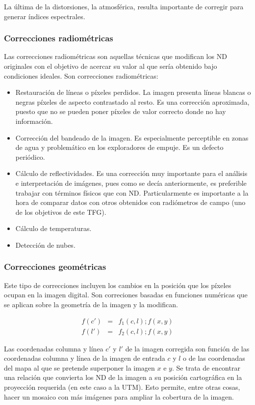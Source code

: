 La última de la distorsiones, la atmosférica, resulta importante de corregir para generar índices espectrales.\Sep

\subsubsection{Correcciones radiométricas}
Las correcciones radiométricas son aquellas técnicas que modifican los \ac{ND} originales con el objetivo de acercar su valor al que sería obtenido bajo condiciones ideales. Son correcciones radiométricas:
\begin{itemize}
	\item Restauración de líneas o píxeles perdidos. La imagen presenta líneas blancas o negras píxeles de aspecto contrastado al resto. Es una corrección aproximada, puesto que no se pueden poner píxeles de valor correcto donde no hay información.
	\item Corrección del bandeado de la imagen. Es especialmente perceptible en zonas de agua y problemático en los exploradores de empuje. Es un defecto periódico.
	\item Cálculo de reflectividades. Es una corrección muy importante para el análisis e interpretación de imágenes, pues como se decía anteriormente, es preferible trabajar con términos físicos que con \ac{ND}. Particularmente es importante a la hora de comparar datos con otros obtenidos con radiómetros de campo (uno de los objetivos de este \ac{TFG}).
	\item Cálculo de temperaturas.
	\item Detección de nubes.
\end{itemize}

\subsubsection{Correcciones geométricas}
Este tipo de correcciones incluyen los cambios en la posición que los píxeles ocupan en la imagen digital. Son correciones basadas en funciones numéricas que se aplican sobre la geometría de la imagen y la modifican.\Sep

\begin{eqnarray}
	f(c') & = & f_{1}(c,l) ; f(x,y) \\
	f(l') & = & f_{2}(c,l) ; f(x,y)
	\label{eq:correcgeom}
\end{eqnarray}\Sep

Las coordenadas columna y línea $c'$ y $l'$ de la imagen corregida son función de las coordenadas columna y línea de la imagen de entrada $c$ y $l$ o de las coordenadas del mapa al que se pretende superponer la imagen $x$ e $y$. Se trata de encontrar una relación que convierta los \ac{ND} de la imagen a su posición cartográfica en la proyección requerida (en este caso a la \ac{UTM}). Esto permite, entre otras cosas, hacer un mosaico con más imágenes para ampliar la cobertura de la imagen.\Sep


